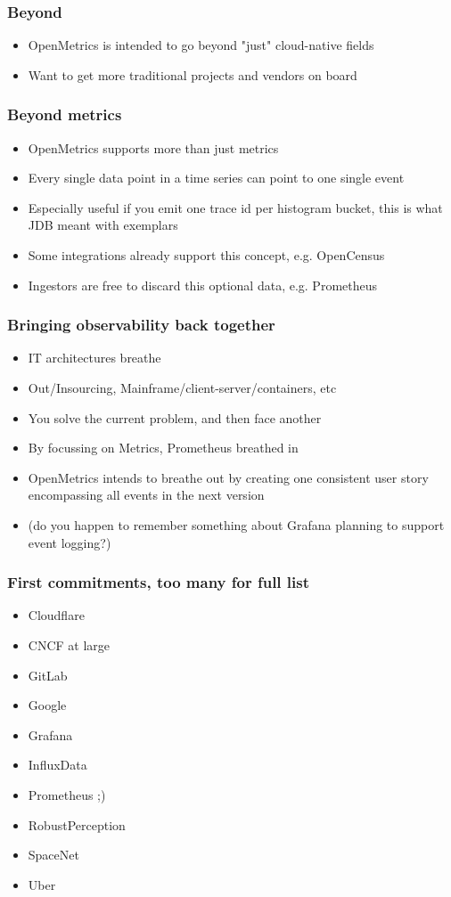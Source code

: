 \documentclass[t]{beamer}
\begin{document}
\begin{frame}
	\frametitle{Beyond}
	\vfill
	\begin{itemize}
		\item OpenMetrics is intended to go beyond "just" cloud-native fields
		\item Want to get more traditional projects and vendors on board
	\end{itemize}
	\vfill
\end{frame}

\begin{frame}
	\frametitle{Beyond metrics}
	\vfill
	\begin{itemize}
		\item OpenMetrics supports more than just metrics
		\item Every single data point in a time series can point to one single event
		\item Especially useful if you emit one trace id per histogram bucket, this is what JDB meant with exemplars
		\item Some integrations already support this concept, e.g. OpenCensus
		\item Ingestors are free to discard this optional data, e.g. Prometheus
	\end{itemize}
	\vfill
\end{frame}

\begin{frame}
	\frametitle{Bringing observability back together}
	\vfill
	\begin{itemize}
		\item IT architectures breathe
		\item Out/Insourcing, Mainframe/client-server/containers, etc
		\item You solve the current problem, and then face another
		\item By focussing on Metrics, Prometheus breathed in
		\item OpenMetrics intends to breathe out by creating one consistent user story encompassing all events in the next version
		\item (do you happen to remember something about Grafana planning to support event logging?)
	\end{itemize}
	\vfill
\end{frame}



\begin{frame}
	\frametitle{First commitments, too many for full list}
	\vfill
	\begin{itemize}
		\item Cloudflare
		\item CNCF at large
		\item GitLab
		\item Google
		\item Grafana
		\item InfluxData
		\item Prometheus ;)
		\item RobustPerception
		\item SpaceNet
		\item Uber
	\end{itemize}
	\vfill
\end{frame}
\end{document}
